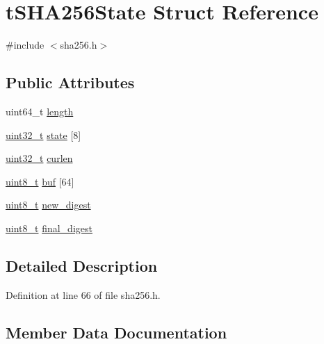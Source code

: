 \hypertarget{structt_s_h_a256_state}{}\section{t\+S\+H\+A256\+State Struct Reference}
\label{structt_s_h_a256_state}


{\ttfamily \#include $<$sha256.\+h$>$}

\subsection*{Public Attributes}
\begin{DoxyCompactItemize}
\item 
uint64\+\_\+t \hyperlink{structt_s_h_a256_state_a055de5e5f24b480958e9548d933a2968}{length}
\item 
\hyperlink{_p_e___types_8h_a33594304e786b158f3fb30289278f5af}{uint32\+\_\+t} \hyperlink{structt_s_h_a256_state_a8e218f4fc37f2dd16ddafb29e6f1f849}{state} \mbox{[}8\mbox{]}
\item 
\hyperlink{_p_e___types_8h_a33594304e786b158f3fb30289278f5af}{uint32\+\_\+t} \hyperlink{structt_s_h_a256_state_a61ac2d62f5f19c336c4b3808262891ad}{curlen}
\item 
\hyperlink{_p_e___types_8h_aba7bc1797add20fe3efdf37ced1182c5}{uint8\+\_\+t} \hyperlink{structt_s_h_a256_state_ac8f2e0c6b43e9cc5468ac45ba4f0e261}{buf} \mbox{[}64\mbox{]}
\item 
\hyperlink{_p_e___types_8h_aba7bc1797add20fe3efdf37ced1182c5}{uint8\+\_\+t} \hyperlink{structt_s_h_a256_state_a958848b0840f5b2f81cd1abce1104034}{new\+\_\+digest}
\item 
\hyperlink{_p_e___types_8h_aba7bc1797add20fe3efdf37ced1182c5}{uint8\+\_\+t} \hyperlink{structt_s_h_a256_state_a54fd0a4c92510f2ca2673afa77979da4}{final\+\_\+digest}
\end{DoxyCompactItemize}


\subsection{Detailed Description}


Definition at line 66 of file sha256.\+h.



\subsection{Member Data Documentation}
